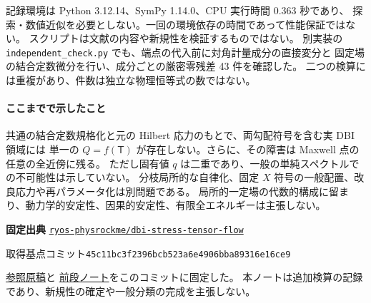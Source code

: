 \documentclass[11pt,a4paper]{article}
\newcommand{\Tmix}{\mathsf T}
\begin{document}
記録環境は Python 3.12.14、SymPy 1.14.0、CPU 実行時間 0.363 秒であり、
探索・数値近似を必要としない。一回の環境依存の時間であって性能保証ではない。
スクリプトは文献の内容や新規性を検証するものではない。
別実装の \texttt{independent\_check.py} でも、端点の代入前に対角計量成分の直接変分と
固定場の結合定数微分を行い、成分ごとの厳密零残差 43 件を確認した。
二つの検算には重複があり、件数は独立な物理恒等式の数ではない。

\paragraph{ここまでで示したこと}
共通の結合定数規格化と元の Hilbert 応力のもとで、両勾配符号を含む実 DBI 領域には
単一の $Q=f(\Tmix)$ が存在しない。さらに、その障害は Maxwell 点の任意の全近傍に残る。
ただし固有値 $q$ は二重であり、一般の単純スペクトルでの不可能性は示していない。
分枝局所的な自律化、固定 $X$ 符号の一般配置、改良応力や再パラメータ化は別問題である。
局所的一定場の代数的構成に留まり、動力学的安定性、因果的安定性、有限全エネルギーは主張しない。

\vspace{3pt}
\noindent\textbf{固定出典}\quad
\href{https://github.com/ryos-physrockme/dbi-stress-tensor-flow/tree/45c11bc3f2396bcb523a6e4906bba89316e16ce9}{\texttt{ryos-physrockme/dbi-stress-tensor-flow}}\par
\noindent\small
取得基点コミット\quad\texttt{45c11bc3f2396bcb523a6e4906bba89316e16ce9}\par
\noindent
\href{https://github.com/ryos-physrockme/dbi-stress-tensor-flow/blob/45c11bc3f2396bcb523a6e4906bba89316e16ce9/paper/paper.tex}{参照原稿}と
\href{https://github.com/ryos-physrockme/dbi-stress-tensor-flow/blob/45c11bc3f2396bcb523a6e4906bba89316e16ce9/research/ch_autonomy_20261101/note.tex}{前段ノート}をこのコミットに固定した。
本ノートは追加検算の記録であり、新規性の確定や一般分類の完成を主張しない。
\end{document}
